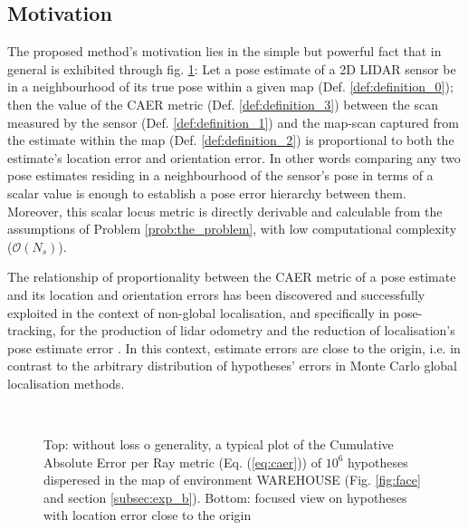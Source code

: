 \subsection{Motivation}

The proposed method's motivation lies in the simple but powerful fact that in
general is exhibited through fig. \ref{fig:motivation_caer}: Let a pose
estimate of a 2D LIDAR sensor be in a neighbourhood of its true pose within a
given map (Def. \ref{def:definition_0}); then the value of the CAER metric
(Def.  \ref{def:definition_3}) between the scan measured by the sensor (Def.
\ref{def:definition_1}) and the map-scan captured from the estimate within the
map (Def. \ref{def:definition_2}) is proportional to both the estimate's
location error and orientation error. In other words comparing any two pose
estimates residing in a neighbourhood of the sensor's pose in terms of a scalar
value is enough to establish a pose error hierarchy between them. Moreover,
this scalar locus metric is directly derivable and calculable from the
assumptions of Problem \ref{prob:the_problem}, with low computational
complexity ($\mathcal{O}(N_s)$).

The relationship of proportionality between the CAER metric of a pose
estimate and its location and orientation errors has been discovered and
successfully exploited in the context of non-global localisation, and
specifically in pose-tracking, for the production of lidar odometry
\cite{Filotheou2022f} and the reduction of localisation's pose estimate error
\cite{Filotheou2023a}. In this context, estimate errors are close to the origin,
i.e. in contrast to the arbitrary distribution of hypotheses' errors in Monte
Carlo global localisation methods.


\begin{figure}\vspace{-2.0cm}
  \subfloat{\hspace{0.5cm}}\vspace{-1.5cm}\\
  \subfloat{\hspace{-0.3cm}}
  \caption{\small Top: without loss o generality, a typical plot of the
           Cumulative Absolute Error per Ray metric (Eq. (\ref{eq:caer})) of
           $10^6$ hypotheses disperesed in the map of environment WAREHOUSE
           (Fig. \ref{fig:face} and section \ref{subsec:exp_b}). Bottom:
           focused view on hypotheses with location error close to the origin}
  \vspace{-0.5cm}
  \label{fig:motivation_caer}
\end{figure}


